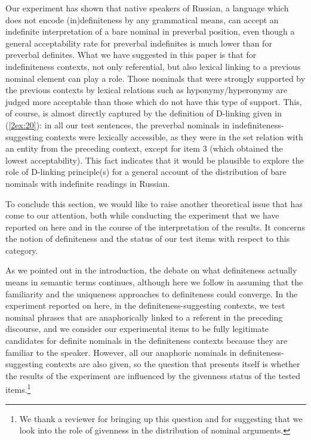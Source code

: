 \documentclass[output=paper]{langsci/langscibook}
\begin{document}
Our experiment has shown that native speakers of Russian, a language which does not encode (in)definiteness by any grammatical means, can accept an indefinite interpretation of a bare nominal in preverbal position, even though a general acceptability rate for preverbal indefinites is much lower than for preverbal definites. What we have suggested in this paper is that for indefiniteness contexts, not only referential, but also lexical linking to a previous nominal element can play a role. Those nominals that were strongly supported by the previous contexts by lexical relations such as hyponymy/hyperonymy are judged more acceptable than those which do not have this type of support. This, of course, is almost directly captured by the definition of D-linking given in (\ref{2ex:20}): in all our test sentences, the preverbal nominals in indefiniteness-suggesting contexts were lexically accessible, as they were in the set relation with an entity from the preceding context, except for item 3 (which obtained the lowest acceptability). This fact indicates that it would be plausible to explore the role of D-linking principle(s) for a general account of the distribution of bare nominals with indefinite readings in Russian.

\filbreak
To conclude this section, we would like to raise another theoretical issue that has come to our attention, both while conducting the experiment that we have reported on here and in the course of the interpretation of the results. It concerns the notion of definiteness and the status of our test items with respect to this category.

As we pointed out in the introduction, the debate on what definiteness actually means in semantic terms continues, although here we follow \cite{farkas:02} in assuming that the familiarity and the uniqueness approaches to definiteness could converge. In the experiment reported on here, in the definiteness-suggesting contexts, we test nominal phrases that are anaphorically linked to a referent in the preceding discourse, and we consider our experimental items to be fully legitimate candidates for definite nominals in the definiteness contexts because they are familiar to the speaker. However, all our anaphoric nominals in definiteness-suggesting contexts are also given, so the question that presents itself is whether the results of the experiment are influenced by the givenness status of the tested items.\footnote{We thank a reviewer for bringing up this question and for suggesting that we look into the role of givenness in the distribution of nominal arguments.}
\end{document}
